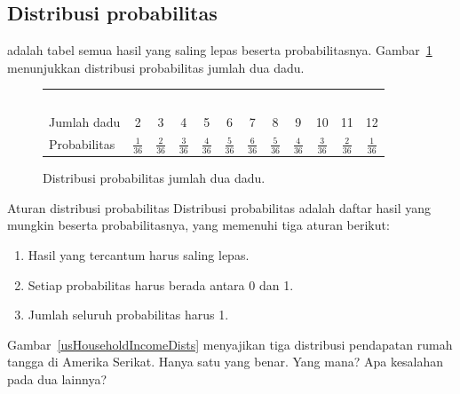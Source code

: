 

\D{\newpage}

\subsection{Distribusi probabilitas}

 adalah tabel semua hasil yang saling lepas beserta probabilitasnya. Gambar~\ref{diceProb} menunjukkan distribusi probabilitas jumlah dua dadu.

\begin{figure}[h] \small
\centering
\begin{tabular}{l ccc ccc ccc cc}
  \hline
  \ \vspace{-3mm} \\
Jumlah dadu\vspace{0.3mm} & 2 & 3 & 4 & 5 & 6 & 7 & 8 & 9 & 10 & 11 & 12  \\
Probabilitas & $\frac{1}{36}$ & $\frac{2}{36}$ & $\frac{3}{36}$ & $\frac{4}{36}$ & $\frac{5}{36}$ & $\frac{6}{36}$ & $\frac{5}{36}$ & $\frac{4}{36}$ & $\frac{3}{36}$ & $\frac{2}{36}$ & $\frac{1}{36}$\vspace{1mm} \\
   \hline
\end{tabular}
\caption{Distribusi probabilitas jumlah dua dadu.}
\label{diceProb}
\end{figure}

\begin{onebox}{Aturan distribusi probabilitas}
Distribusi probabilitas adalah daftar hasil yang mungkin beserta probabilitasnya, yang memenuhi tiga aturan berikut: \vspace{-2mm}
\begin{enumerate}
\setlength{\itemsep}{0mm}
\item Hasil yang tercantum harus saling lepas.
\item Setiap probabilitas harus berada antara 0 dan 1.
\item Jumlah seluruh probabilitas harus 1. \vspace{1mm}
\end{enumerate}
\end{onebox}

\begin{exercisewrap}
\begin{nexercise}\label{usHouseholdIncomeDistsExercise}
Gambar~\ref{usHouseholdIncomeDists} menyajikan tiga distribusi pendapatan rumah tangga di Amerika Serikat. Hanya satu yang benar. Yang mana? Apa kesalahan pada dua lainnya?\footnotemark
\end{nexercise}
\end{exercisewrap}

